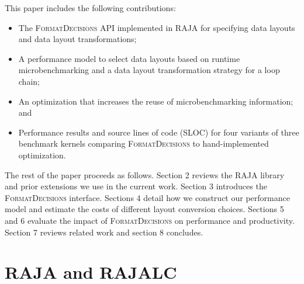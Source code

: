 \documentclass[sigconf,review=true]{acmart}
\newcommand{\FormatDecisions}[0]{{\textsc{FormatDecisions}}}
\begin{document}

This paper includes the following contributions:
\begin{itemize}
\item The \FormatDecisions{} API implemented in RAJA for specifying data layouts and data layout transformations;
\item A performance model to select data layouts based on runtime microbenchmarking and a data layout transformation strategy for a loop chain;
\item An optimization that increases the reuse of microbenchmarking information; and
\item Performance results and source lines of code (SLOC) for four variants of three benchmark kernels comparing \FormatDecisions{} to hand-implemented optimization.
\end{itemize} 

The rest of the paper proceeds as follows. 
Section 2 reviews the RAJA library and prior extensions we use in the current work.
Section 3 introduces the \FormatDecisions{} interface.
Sections 4 detail how we construct our performance model and estimate the costs of different layout conversion choices.
Sections 5 and 6 evaluate the impact of \FormatDecisions{}  on performance and productivity.
Section 7 reviews related work and section 8 concludes.


\section{RAJA and RAJALC}
\end{document}
